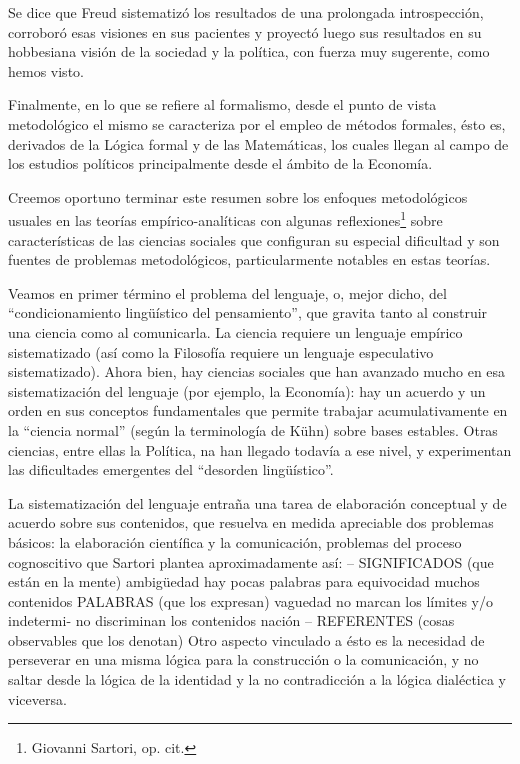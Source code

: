 \documentclass[
]{book}
\begin{document}
Se dice que Freud sistematizó los resultados de una prolongada introspección, corroboró esas visiones en sus pacientes y proyectó luego sus resultados en su hobbesiana visión de la sociedad y la política, con fuerza muy sugerente, como hemos visto.

Finalmente, en lo que se refiere al formalismo, desde el punto de vista metodológico el mismo se caracteriza por el empleo de métodos formales, ésto es, derivados de la Lógica formal y de las Matemáticas, los cuales llegan al campo de los estudios políticos principalmente desde el ámbito de la Economía.

Creemos oportuno terminar este resumen sobre los enfoques metodológicos usuales en las teorías empírico-analíticas con algunas reflexiones\footnote{Giovanni Sartori, op. cit.} sobre características de las ciencias sociales que configuran su especial dificultad y son fuentes de problemas metodológicos, particularmente notables en estas teorías.

Veamos en primer término el problema del lenguaje, o, mejor dicho, del ``condicionamiento lingüístico del pensamiento'', que gravita tanto al construir una ciencia como al comunicarla. La ciencia requiere un lenguaje empírico sistematizado (así como la Filosofía requiere un lenguaje especulativo sistematizado). Ahora bien, hay ciencias sociales que han avanzado mucho en esa sistematización del lenguaje (por ejemplo, la Economía): hay un acuerdo y un orden en sus conceptos fundamentales que permite trabajar acumulativamente en la ``ciencia normal'' (según la terminología de Kühn) sobre bases estables. Otras ciencias, entre ellas la Política, na han llegado todavía a ese nivel, y experimentan las dificultades emergentes del ``desorden lingüístico''.

La sistematización del lenguaje entraña una tarea de elaboración conceptual y de acuerdo sobre sus contenidos, que resuelva en medida apreciable dos problemas básicos: la elaboración científica y la comunicación, problemas del proceso cognoscitivo que Sartori plantea aproximadamente así: -- SIGNIFICADOS (que están en la mente) \textbar{} \textbar{} \textbar{} \textbar{} ambigüedad \textbar{} hay pocas palabras para \textbar{} \textbar{} equivocidad \textbar{} muchos contenidos \textbar{} \textbar{} \textbar{} PALABRAS (que los expresan) \textbar{} \textbar{} \textbar{} \textbar{} vaguedad \textbar{} no marcan los límites y/o \textbar{} \textbar{} indetermi- \textbar{} no discriminan los contenidos \textbar{} \textbar{} nación \textbar{} \textbar{} \textbar{} -- REFERENTES (cosas observables que los denotan) Otro aspecto vinculado a ésto es la necesidad de perseverar en una misma lógica para la construcción o la comunicación, y no saltar desde la lógica de la identidad y la no contradicción a la lógica dialéctica y viceversa.
\end{document}
